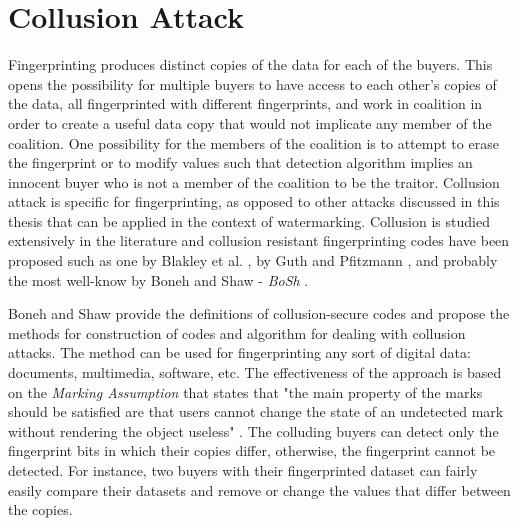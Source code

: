\section{Collusion Attack} \label{subsec:collusion}

Fingerprinting produces distinct copies of the data for each of the buyers. 
This opens the possibility for multiple buyers to have access to each other's copies of the data, all fingerprinted with different fingerprints, and work in coalition in order to create a useful data copy that would not implicate any member of the coalition. 
One possibility for the members of the coalition is to attempt to erase the fingerprint or to modify values such that detection algorithm implies an innocent buyer who is not a member of the coalition to be the traitor.
Collusion attack is specific for fingerprinting, as opposed to other attacks discussed in this thesis that can be applied in the context of watermarking. 
Collusion is studied extensively in the literature \cite{boneh1998collusion, guth1999error, pfitzmann1999coin, pfitzmann1996asymmetric, yacobi2001improved} and collusion resistant fingerprinting codes have been proposed such as one by Blakley et al. \cite{blakley1985fingerprinting}, by Guth and Pfitzmann \cite{blakley1985fingerprinting}, and probably the most well-know by Boneh and Shaw - \textit{BoSh} \cite{boneh1998collusion}.

Boneh and Shaw \cite{boneh1998collusion} provide the definitions of collusion-secure codes and propose the methods for construction of codes and algorithm for dealing with collusion attacks. 
The method can be used for fingerprinting any sort of digital data: documents, multimedia, software, etc. 
The effectiveness of the approach is based on the \textit{Marking Assumption} that states that "the main property of the marks should be satisfied are that users cannot change the state of an undetected mark without rendering the object useless" \cite{boneh1998collusion}. The colluding buyers can detect only the fingerprint bits in which their copies differ, otherwise, the fingerprint cannot be detected. 
For instance, two buyers with their fingerprinted dataset can fairly easily compare their datasets and remove or change the values that differ between the copies.

